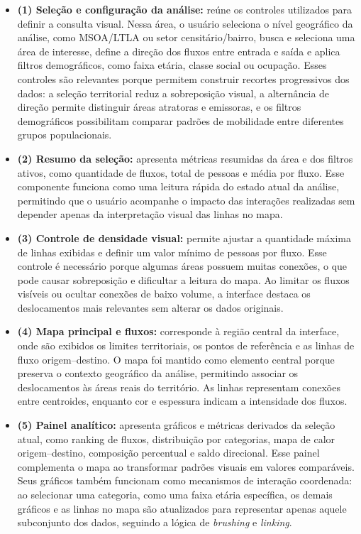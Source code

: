 \documentclass[12pt]{article}
\begin{document}
\begin{itemize}
    \item \textbf{(1) Seleção e configuração da análise:} reúne os controles utilizados para definir a consulta visual. Nessa área, o usuário seleciona o nível geográfico da análise, como MSOA/LTLA ou setor censitário/bairro, busca e seleciona uma área de interesse, define a direção dos fluxos entre entrada e saída e aplica filtros demográficos, como faixa etária, classe social ou ocupação. Esses controles são relevantes porque permitem construir recortes progressivos dos dados: a seleção territorial reduz a sobreposição visual, a alternância de direção permite distinguir áreas atratoras e emissoras, e os filtros demográficos possibilitam comparar padrões de mobilidade entre diferentes grupos populacionais.
    \item \textbf{(2) Resumo da seleção:} apresenta métricas resumidas da área e dos filtros ativos, como quantidade de fluxos, total de pessoas e média por fluxo. Esse componente funciona como uma leitura rápida do estado atual da análise, permitindo que o usuário acompanhe o impacto das interações realizadas sem depender apenas da interpretação visual das linhas no mapa.

    \item \textbf{(3) Controle de densidade visual:} permite ajustar a quantidade máxima de linhas exibidas e definir um valor mínimo de pessoas por fluxo. Esse controle é necessário porque algumas áreas possuem muitas conexões, o que pode causar sobreposição e dificultar a leitura do mapa. Ao limitar os fluxos visíveis ou ocultar conexões de baixo volume, a interface destaca os deslocamentos mais relevantes sem alterar os dados originais.

    \item \textbf{(4) Mapa principal e fluxos:} corresponde à região central da interface, onde são exibidos os limites territoriais, os pontos de referência e as linhas de fluxo origem--destino. O mapa foi mantido como elemento central porque preserva o contexto geográfico da análise, permitindo associar os deslocamentos às áreas reais do território. As linhas representam conexões entre centroides, enquanto cor e espessura indicam a intensidade dos fluxos.

    \item \textbf{(5) Painel analítico:} apresenta gráficos e métricas derivados da seleção atual, como ranking de fluxos, distribuição por categorias, mapa de calor origem--destino, composição percentual e saldo direcional. Esse painel complementa o mapa ao transformar padrões visuais em valores comparáveis. Seus gráficos também funcionam como mecanismos de interação coordenada: ao selecionar uma categoria, como uma faixa etária específica, os demais gráficos e as linhas no mapa são atualizados para representar apenas aquele subconjunto dos dados, seguindo a lógica de \textit{brushing} e \textit{linking}.


\end{itemize}
\end{document}
